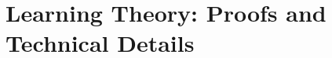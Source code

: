 \documentclass[11pt]{article}
\begin{document}



\section{Learning Theory: Proofs and Technical Details}
\label{app:est}
\end{document}
